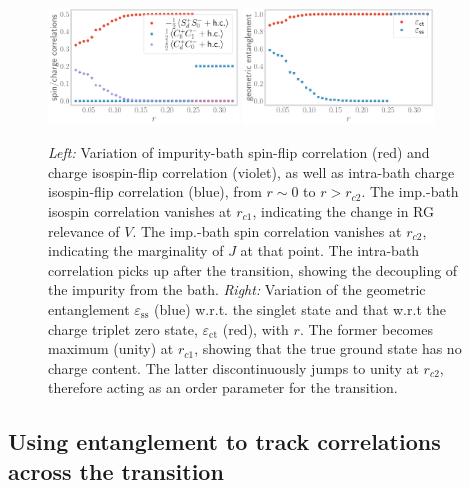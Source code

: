 \documentclass{iopart}
\begin{document}
\begin{figure}[!htb]
	\includegraphics[width=0.45\textwidth]{spin-charge-corr-full.pdf}
	\hspace*{\fill}
	\includegraphics[width=0.45\textwidth]{entanglement.pdf}
	\caption{{\it Left:} Variation of impurity-bath spin-flip correlation (red) and charge isospin-flip correlation (violet), as well as intra-bath charge isospin-flip correlation (blue), from \(r \sim 0\) to \(r > r_{c2}\). The imp.-bath isospin correlation vanishes at \(r_{c1}\), indicating the change in RG relevance of \(V\). The imp.-bath spin correlation vanishes at \(r_{c2}\), indicating the marginality of \(J\) at that point. The intra-bath correlation picks up after the transition, showing the decoupling of the impurity from the bath. {\it Right:} Variation of the geometric entanglement \(\varepsilon_\text{ss}\) (blue) w.r.t. the singlet state and that w.r.t the charge triplet zero state, \(\varepsilon_\text{ct}\) (red), with \(r\). The former becomes maximum (unity) at \(r_{c1}\), showing that the true ground state has no charge content. The latter discontinuously jumps to unity at \(r_{c2}\), therefore acting as an order parameter for the transition.}
	\label{gstate-correlations}
\end{figure}

\subsection{Using entanglement to track correlations across the transition}
\end{document}
